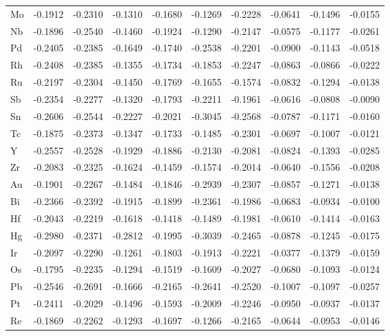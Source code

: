 \begin{table}[h]
{\begin{tabular}{*{10}{l}}
      Mo & -0.1912 & -0.2310 & -0.1310 & -0.1680 & -0.1269 & -0.2228 & -0.0641 & -0.1496 & -0.0155 \\
      Nb & -0.1896 & -0.2540 & -0.1460 & -0.1924 & -0.1290 & -0.2147 & -0.0575 & -0.1177 & -0.0261 \\
      Pd & -0.2405 & -0.2385 & -0.1649 & -0.1740 & -0.2538 & -0.2201 & -0.0900 & -0.1143 & -0.0518 \\
      Rh & -0.2408 & -0.2385 & -0.1355 & -0.1734 & -0.1853 & -0.2247 & -0.0863 & -0.0866 & -0.0222 \\
      Ru & -0.2197 & -0.2304 & -0.1450 & -0.1769 & -0.1655 & -0.1574 & -0.0832 & -0.1294 & -0.0138 \\
      Sb & -0.2354 & -0.2277 & -0.1320 & -0.1793 & -0.2211 & -0.1961 & -0.0616 & -0.0808 & -0.0090 \\
      Sn & -0.2606 & -0.2544 & -0.2227 & -0.2021 & -0.3045 & -0.2568 & -0.0787 & -0.1171 & -0.0160 \\
      Tc & -0.1875 & -0.2373 & -0.1347 & -0.1733 & -0.1485 & -0.2301 & -0.0697 & -0.1007 & -0.0121 \\
      Y  & -0.2557 & -0.2528 & -0.1929 & -0.1886 & -0.2130 & -0.2081 & -0.0824 & -0.1393 & -0.0285 \\
      Zr & -0.2083 & -0.2325 & -0.1624 & -0.1459 & -0.1574 & -0.2014 & -0.0640 & -0.1556 & -0.0208 \\
      Au & -0.1901 & -0.2267 & -0.1484 & -0.1846 & -0.2939 & -0.2307 & -0.0857 & -0.1271 & -0.0138 \\
      Bi & -0.2366 & -0.2392 & -0.1915 & -0.1899 & -0.2361 & -0.1986 & -0.0683 & -0.0934 & -0.0100 \\
      Hf & -0.2043 & -0.2219 & -0.1618 & -0.1418 & -0.1489 & -0.1981 & -0.0610 & -0.1414 & -0.0163 \\
      Hg & -0.2980 & -0.2371 & -0.2812 & -0.1995 & -0.3039 & -0.2465 & -0.0878 & -0.1245 & -0.0175 \\
      Ir & -0.2097 & -0.2290 & -0.1261 & -0.1803 & -0.1913 & -0.2221 & -0.0377 & -0.1379 & -0.0159 \\
      Os & -0.1795 & -0.2235 & -0.1294 & -0.1519 & -0.1609 & -0.2027 & -0.0680 & -0.1093 & -0.0124 \\
      Pb & -0.2546 & -0.2691 & -0.1666 & -0.2165 & -0.2641 & -0.2520 & -0.1007 & -0.1097 & -0.0257 \\
      Pt & -0.2411 & -0.2029 & -0.1496 & -0.1593 & -0.2009 & -0.2246 & -0.0950 & -0.0937 & -0.0137 \\
      Re & -0.1869 & -0.2262 & -0.1293 & -0.1697 & -0.1266 & -0.2165 & -0.0644 & -0.0953 & -0.0146 \\

\end{tabular}}
\end{table}
